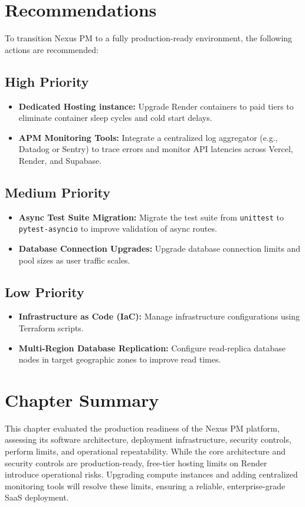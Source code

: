 \section{Recommendations}
To transition Nexus PM to a fully production-ready environment, the following actions are recommended:

\subsection{High Priority}
\begin{itemize}
    \item \textbf{Dedicated Hosting instance:} Upgrade Render containers to paid tiers to eliminate container sleep cycles and cold start delays.
    \item \textbf{APM Monitoring Tools:} Integrate a centralized log aggregator (e.g., Datadog or Sentry) to trace errors and monitor API latencies across Vercel, Render, and Supabase.
\end{itemize}

\subsection{Medium Priority}
\begin{itemize}
    \item \textbf{Async Test Suite Migration:} Migrate the test suite from \texttt{unittest} to \texttt{pytest-asyncio} to improve validation of async routes.
    \item \textbf{Database Connection Upgrades:} Upgrade database connection limits and pool sizes as user traffic scales.
\end{itemize}

\subsection{Low Priority}
\begin{itemize}
    \item \textbf{Infrastructure as Code (IaC):} Manage infrastructure configurations using Terraform scripts.
    \item \textbf{Multi-Region Database Replication:} Configure read-replica database nodes in target geographic zones to improve read times.
\end{itemize}

\section{Chapter Summary}
This chapter evaluated the production readiness of the Nexus PM platform, assessing its software architecture, deployment infrastructure, security controls, perform limits, and operational repeatability. While the core architecture and security controls are production-ready, free-tier hosting limits on Render introduce operational risks. Upgrading compute instances and adding centralized monitoring tools will resolve these limits, ensuring a reliable, enterprise-grade SaaS deployment.
